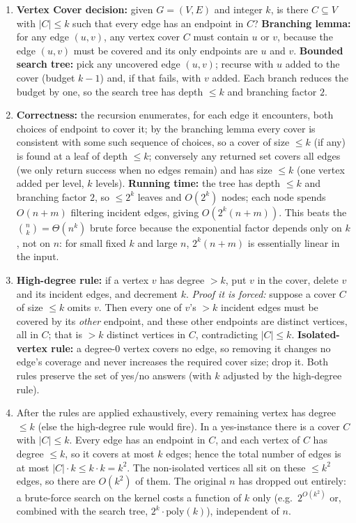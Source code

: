 \documentclass[11pt]{article}
\begin{document}
\begin{enumerate}[label=\textbf{A\arabic*.}, leftmargin=2.2em]
\item \textbf{Vertex Cover decision:} given $G=(V,E)$ and integer $k$, is there
$C \subseteq V$ with $|C|\le k$ such that every edge has an endpoint in $C$?
\textbf{Branching lemma:} for any edge $(u,v)$, any vertex cover $C$ must
contain $u$ or $v$, because the edge $(u,v)$ must be covered and its only
endpoints are $u$ and $v$. \textbf{Bounded search tree:} pick any uncovered edge
$(u,v)$; recurse with $u$ added to the cover (budget $k-1$) and, if that fails,
with $v$ added. Each branch reduces the budget by one, so the search tree has
depth $\le k$ and branching factor $2$.

\item \textbf{Correctness:} the recursion enumerates, for each edge it
encounters, both choices of endpoint to cover it; by the branching lemma every
cover is consistent with some such sequence of choices, so a cover of size
$\le k$ (if any) is found at a leaf of depth $\le k$; conversely any returned
set covers all edges (we only return success when no edges remain) and has size
$\le k$ (one vertex added per level, $k$ levels). \textbf{Running time:} the
tree has depth $\le k$ and branching factor $2$, so $\le 2^k$ leaves and
$O(2^k)$ nodes; each node spends $O(n+m)$ filtering incident edges, giving
$O(2^k(n+m))$. This beats the $\binom{n}{k} = \Theta(n^k)$ brute force because
the exponential factor depends only on $k$, not on $n$: for small fixed $k$ and
large $n$, $2^k(n+m)$ is essentially linear in the input.

\item \textbf{High-degree rule:} if a vertex $v$ has degree $> k$, put $v$ in
the cover, delete $v$ and its incident edges, and decrement $k$. \emph{Proof it
is forced:} suppose a cover $C$ of size $\le k$ omits $v$. Then every one of
$v$'s $> k$ incident edges must be covered by its \emph{other} endpoint, and
these other endpoints are distinct vertices, all in $C$; that is $> k$ distinct
vertices in $C$, contradicting $|C| \le k$. \textbf{Isolated-vertex rule:} a
degree-$0$ vertex covers no edge, so removing it changes no edge's coverage and
never increases the required cover size; drop it. Both rules preserve the set of
yes/no answers (with $k$ adjusted by the high-degree rule).

\item After the rules are applied exhaustively, every remaining vertex has
degree $\le k$ (else the high-degree rule would fire). In a yes-instance there
is a cover $C$ with $|C|\le k$. Every edge has an endpoint in $C$, and each
vertex of $C$ has degree $\le k$, so it covers at most $k$ edges; hence the
total number of edges is at most $|C|\cdot k \le k\cdot k = k^2$. The
non-isolated vertices all sit on these $\le k^2$ edges, so there are $O(k^2)$ of
them. The original $n$ has dropped out entirely: a brute-force search on the
kernel costs a function of $k$ only (e.g.\ $2^{O(k^2)}$ or, combined with the
search tree, $2^k \cdot \mathrm{poly}(k)$), independent of $n$.


\end{enumerate}
\end{document}
